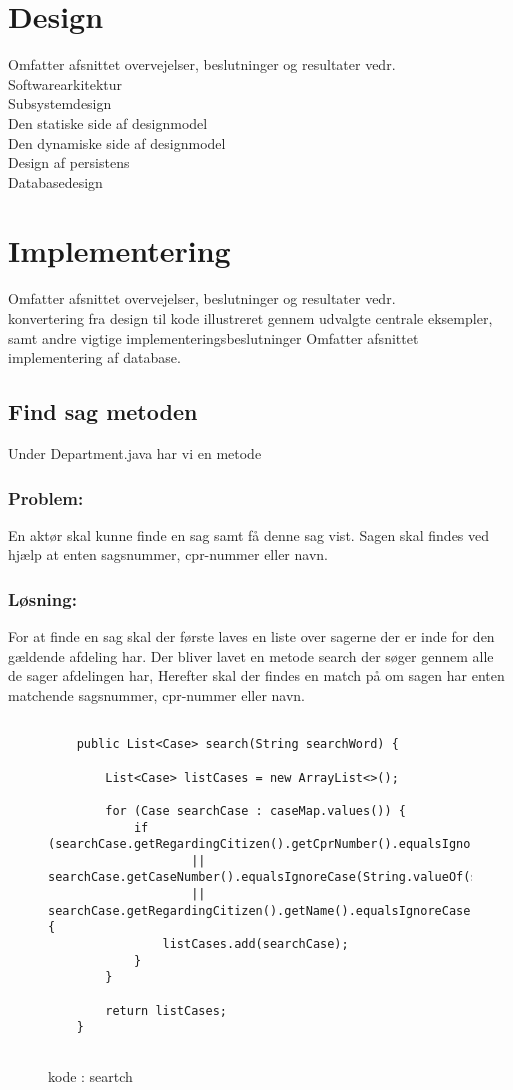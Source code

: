\section{Design}
Omfatter afsnittet overvejelser, beslutninger og resultater vedr.\\
Softwarearkitektur\\
Subsystemdesign\\
Den statiske side af designmodel\\
Den dynamiske side af designmodel\\
Design af persistens\\
Databasedesign\\

\section{Implementering}
Omfatter afsnittet overvejelser, beslutninger og resultater vedr.\\  konvertering fra design til kode illustreret gennem udvalgte centrale eksempler, samt andre vigtige implementeringsbeslutninger
Omfatter afsnittet implementering af database.



\subsection{Find sag metoden}
Under Department.java har vi en metode 
\subsubsection{Problem: }
En aktør skal kunne finde en sag samt få denne sag vist. Sagen skal findes ved hjælp at enten sagsnummer, cpr-nummer eller navn. 
\subsubsection{Løsning: }
For at finde en sag skal der første laves en liste over sagerne der er inde for den gældende afdeling har. 
Der bliver lavet en metode search der søger gennem alle de sager afdelingen har,
Herefter skal der findes en match på om sagen har enten matchende sagsnummer, cpr-nummer eller navn. 
\begin{figure}[h]
\begin{lstlisting}

    public List<Case> search(String searchWord) {

        List<Case> listCases = new ArrayList<>();

        for (Case searchCase : caseMap.values()) {
            if (searchCase.getRegardingCitizen().getCprNumber().equalsIgnoreCase(searchWord)
                    || searchCase.getCaseNumber().equalsIgnoreCase(String.valueOf(searchWord))
                    || searchCase.getRegardingCitizen().getName().equalsIgnoreCase(searchWord)) {
                listCases.add(searchCase);
            }
        }

        return listCases;
    }


\end{lstlisting}
\caption{kode : seartch}
\label{kode:Search}
\end{figure}



